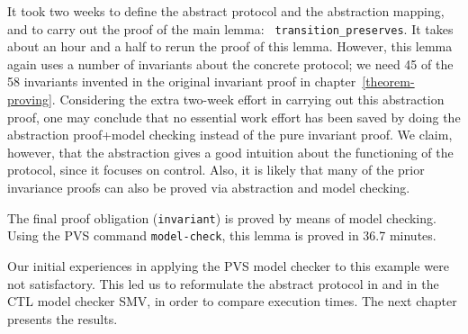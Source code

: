 It took two weeks to define the abstract  protocol and the abstraction
mapping,  and  to carry   out   the proof of    the main  lemma:  {\tt
transition\_preserves}.  It takes about an  hour and  a half to  rerun
the proof of this  lemma.  However, this lemma  again uses a number of
invariants about    the concrete  protocol;   we need  45  of  the  58
invariants     invented  in    the    original   invariant  proof   in
chapter~\ref{theorem-proving}.   Considering the extra two-week effort
in carrying  out  this abstraction proof,  one  may  conclude that  no
essential  work effort  has    been saved by  doing   the  abstraction
proof+model  checking instead of  the pure invariant proof.  We claim,
however,    that  the abstraction gives  a    good intuition about the
functioning of the protocol, since it focuses on control.  Also, it is
likely that many of the prior invariance proofs can also be proved via
abstraction and model checking.

The final proof obligation ({\tt invariant}) is proved
by means of model checking.  Using the PVS command {\tt model-check}, 
this lemma is proved in  36.7 minutes.

Our initial experiences in applying the PVS model checker to this  
example  were not satisfactory.   This led  us  to reformulate  the
abstract protocol in \Murphi{} and in the CTL 
model checker  SMV, in order to compare execution  times.  The next
chapter presents the results.

